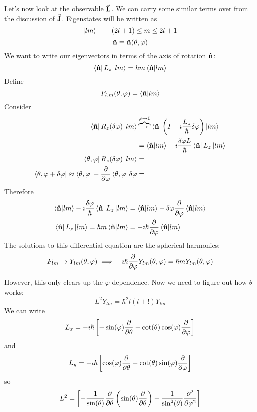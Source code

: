 \documentclass[a4paper,twoside,master.tex]{subfiles}
\begin{document}
Let's now look at the observable $ \va{L} $. We can carry some similar terms over from the discussion of $ \va{J} $. Eigenstates will be written as
\begin{equation}
    \ket{lm} \quad -(2l+1) \leq m \leq 2l+1
\end{equation}
\begin{equation}
    \vu{n} \equiv \vu{n}(\theta, \varphi)
\end{equation}
We want to write our eigenvectors in terms of the axis of rotation $ \vu{n} $:
\begin{equation}
    \bra{\vu{n}} L_z\ket{lm} = \hbar m\bra{\vu{n}}\ket{lm}
\end{equation}
Define
\begin{equation}
    F_{l,m}(\theta, \varphi) =\bra{\vu{n}}\ket{lm}
\end{equation}
Consider
\begin{align}
    \bra{\vu{n}} R_z(\delta \varphi)\ket{lm} &\overbrace{\to}^{\varphi \to 0}\bra{\vu{n}} \left( I - \imath \frac{L_z}{\hbar} \delta \varphi \right)\ket{lm}\\
    &=\bra{\vu{n}}\ket{lm} - \imath \frac{\delta \varphi L}{\hbar}\bra{\vu{n}} L_z\ket{lm} \\
    \bra{\theta, \varphi} R_z(\delta \varphi)\ket{lm} &= \\
    \bra{\theta, \varphi + \delta \varphi} \approx\bra{\theta, \varphi} - \pdv{\varphi}\bra{\theta, \varphi} \delta \varphi &= 
\end{align}
Therefore
\begin{align}
    \bra{\vu{n}}\ket{lm} - \imath \frac{\delta \varphi}{\hbar}\bra{\vu{n}} L_z\ket{lm} &=\bra{\vu{n}}\ket{lm} - \delta \varphi \pdv{\varphi}\bra{\vu{n}}\ket{lm} \\
    \bra{\vu{n}} L_z\ket{lm} = \hbar m\bra{\vu{n}}\ket{lm} &= - \imath \hbar \pdv{\varphi}\bra{\vu{n}}\ket{lm}
\end{align}
The solutions to this differential equation are the spherical harmonics:
\begin{equation}
    F_{lm} \to Y_{lm}(\theta, \varphi) \implies - \imath \hbar \pdv{\varphi} Y_{lm}(\theta, \varphi) = \hbar m Y_{lm}(\theta, \varphi)
\end{equation}

However, this only clears up the $\varphi$ dependence. Now we need to figure out how $ \theta $ works:
\begin{equation}
    L^2 Y_{lm} = \hbar^2 l(l+!) Y_{lm}
\end{equation}
We can write
\begin{equation}
    L_x = - \imath \hbar \left[ - \sin(\varphi) \pdv{\theta} - \cot(\theta) \cos(\varphi) \pdv{\varphi} \right]
\end{equation}
and
\begin{equation}
    L_y = - \imath \hbar \left[ \cos(\varphi) \pdv{\theta} - \cot(\theta) \sin(\varphi) \pdv{\varphi} \right]
\end{equation}
so
\begin{equation}
    L^2 = \left[ - \frac{1}{\sin(\theta)} \pdv{\theta} \left( \sin(\theta) \pdv{\theta} \right)- \frac{1}{\sin[2](\theta)} \pdv[2]{\varphi} \right]
\end{equation}
\end{document}
